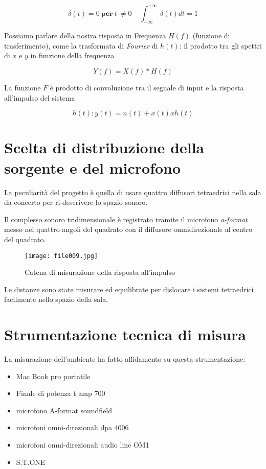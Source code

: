 \begin{equation}
\delta(t) = 0~\textbf{per}~t~\neq 0~~~~~\int_{-\infty}^{+\infty}~\delta(t)dt=1
\end{equation}


Possiamo parlare della nostra risposta in Frequenza $H(f)$ (funzione di trasferimento),
come la  trasformata di \emph{Fourier} di $h(t)$: il prodotto tra gli spettri di $x$ e $y$ in funzione della frequenza

\begin{equation}
Y(f)= X(f)*H(f) 
\end{equation}

La funzione $F$ è prodotto di convoluzione tra il segnale di input e la risposta all'impulso del sistema

\begin{equation}
h(t):y(t)= n(t) + x(t) x h(t)
\end{equation}


\section{Scelta di distribuzione della sorgente e del microfono}

La peculiarità del progetto è quella di usare  quattro diffusori tetraedrici nella sala
da concerto per ri-descrivere lo spazio sonoro.

Il complesso sonoro tridimensionale è registrato tramite il microfono \emph{a-format}
messo nei quattro angoli del quadrato con il diffusore omnidirezionale al centro del quadrato. 

\begin{figure}
\centering
{\texttt{[image: file009.jpg]}}
\caption[Pianta S. Luca]{Catena di misurazione della risposta all'impulso}
\label{fig:tetratetra}
\end{figure}

Le distanze sono state misurare ed equilibrate per dislocare i sistemi tetraedrici
facilmente nello spazio della sala.

\section{Strumentazione tecnica di misura}

La misurazione dell'ambiente ha fatto affidamento su questa strumentazione:

\begin{itemize}
	\item Mac Book pro portatile
	\item Finale di potenza t amp 700
	\item microfono A-format soundfield
	\item microfoni omni-direzionali dpa 4006
	\item microfoni omni-direzionali audio line OM1
	\item S.T.ONE
\end{itemize}

